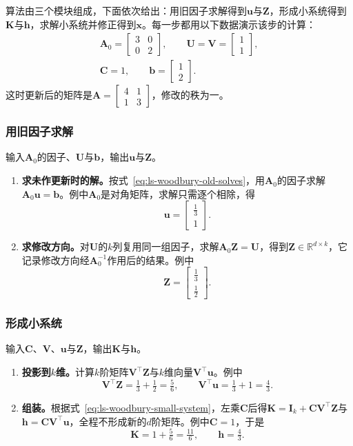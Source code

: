 算法由三个模块组成，下面依次给出：用旧因子求解得到$\bm u$与$\bm Z$，形成小系统得到$\bm K$与$\bm h$，求解小系统并修正得到$\bm x$。每一步都用以下数据演示该步的计算：
\[
 \begin{gathered}
 \bm A_0=\begin{bmatrix}3&0\\0&2\end{bmatrix},\qquad
 \bm U=\bm V=\begin{bmatrix}1\\1\end{bmatrix},\\
 \bm C=1,\qquad
 \bm b=\begin{bmatrix}1\\2\end{bmatrix}.
 \end{gathered}
\]
这时更新后的矩阵是$\bm A=\left[\begin{smallmatrix}4&1\\1&3\end{smallmatrix}\right]$，修改的秩为一。

\subsubsection{用旧因子求解}
输入$\bm A_0$的因子、$\bm U$与$\bm b$，输出$\bm u$与$\bm Z$。
\begin{enumerate}
 \item \textbf{求未作更新时的解。}按式~\eqref{eq:ls-woodbury-old-solves}，用$\bm A_0$的因子求解$\bm A_0\bm u=\bm b$。例中$\bm A_0$是对角矩阵，求解只需逐个相除，得
 \[
  \bm u=\begin{bmatrix}\tfrac13\\1\end{bmatrix}.
 \]

 \item \textbf{求修改方向。}对$\bm U$的$k$列复用同一组因子，求解$\bm A_0\bm Z=\bm U$，得到$\bm Z\in\mathbb R^{d\times k}$，它记录修改方向经$\bm A_0^{-1}$作用后的结果。例中
 \[
  \bm Z=\begin{bmatrix}\tfrac13\\\tfrac12\end{bmatrix}.
 \]
\end{enumerate}

\subsubsection{形成小系统}
输入$\bm C$、$\bm V$、$\bm u$与$\bm Z$，输出$\bm K$与$\bm h$。
\begin{enumerate}
 \item \textbf{投影到$k$维。}计算$k$阶矩阵$\bm V^\top\bm Z$与$k$维向量$\bm V^\top\bm u$。例中
 \[
  \bm V^\top\bm Z=\tfrac13+\tfrac12=\tfrac56,\qquad
  \bm V^\top\bm u=\tfrac13+1=\tfrac43 .
 \]

 \item \textbf{组装。}根据式~\eqref{eq:ls-woodbury-small-system}，左乘$\bm C$后得$\bm K=\bm I_k+\bm C\bm V^\top\bm Z$与$\bm h=\bm C\bm V^\top\bm u$，全程不形成新的$d$阶矩阵。例中$\bm C=1$，于是
 \[
  \bm K=1+\tfrac56=\tfrac{11}6,\qquad
  \bm h=\tfrac43 .
 \]
\end{enumerate}


